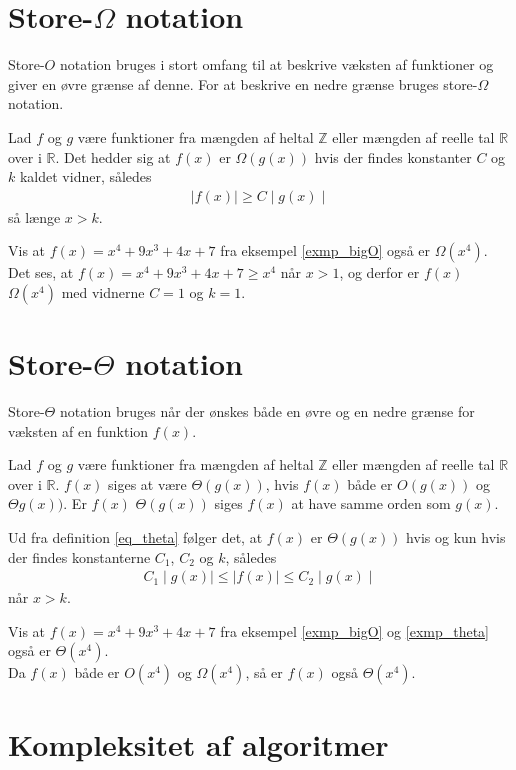 \section{Store-$\Omega$ notation}
Store-$O$ notation bruges i stort omfang til at beskrive væksten af funktioner og giver en øvre grænse af denne. 
For at beskrive en nedre grænse bruges store-$\Omega$ notation. \\
\begin{defn}
	Lad $f$ og $g$ være funktioner fra mængden af heltal $\mathbb{Z}$ eller mængden af reelle tal $\mathbb{R}$ over i $\mathbb{R}$. 
	Det hedder sig at $f(x)$ er $\Omega(g(x))$ hvis der findes konstanter $C$ og $k$ kaldet vidner, således 
	\begin{align*}
		\mid f(x) \mid \geq C \mid g(x) \mid
	\end{align*}
så længe $x>k$.
\end{defn}

\begin{exmp}\label{exmp_theta}
Vis at $f(x)=x^4+9x^3+4x+7$ fra eksempel \ref{exmp_bigO} også er $\Omega(x^4)$. \\
Det ses, at $f(x)=x^4+9x^3+4x+7 \geq x^4 $ når $x>1$, og derfor er $f(x)$ $\Omega(x^4)$ med vidnerne $C=1$ og $k=1$.
\end{exmp}

\section{Store-$\Theta$ notation}
Store-$\Theta$ notation bruges når der ønskes både en øvre og en nedre grænse for væksten af en funktion $f(x)$. \\
\begin{defn}\label{eq_theta}
	Lad $f$ og $g$ være funktioner fra mængden af heltal $\mathbb{Z}$ eller mængden af reelle tal $\mathbb{R}$ over i $\mathbb{R}$. 
	$f(x)$ siges at være $\Theta (g(x))$, hvis $f(x)$ både er $O(g(x))$ og $\Theta g(x))$. 
	Er $f(x)$ $\Theta (g(x))$ siges $f(x)$ at have samme orden som $g(x)$. 
\end{defn}
Ud fra definition \ref{eq_theta} følger det, at $f(x)$ er $\Theta (g(x))$ hvis og kun hvis der findes konstanterne $C_1$, $C_2$ og $k$, således
\begin{align*}
	C_1 \mid g(x) \mid \leq \mid f(x) \mid \leq C_2 \mid g(x) \mid
\end{align*}
når $x>k$. \\
\begin{exmp}
	Vis at $f(x)=x^4+9x^3+4x+7$ fra eksempel \ref{exmp_bigO} og \ref{exmp_theta} også er $\Theta(x^4)$. \\
	Da $f(x)$ både er $O(x^4)$ og $\Omega (x^4)$, så er $f(x)$ også $\Theta (x^4)$.
\end{exmp}

\section{Kompleksitet af algoritmer}
